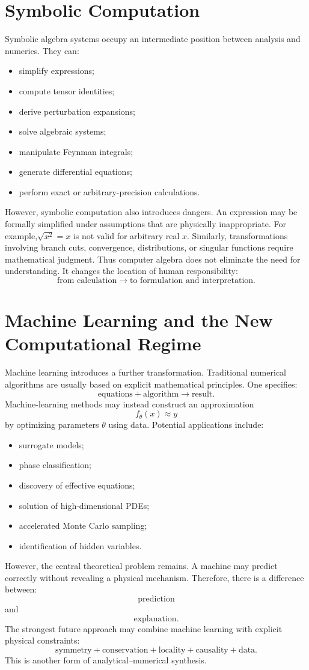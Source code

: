 \section{ Symbolic Computation}
\label{nm:sc}

Symbolic algebra systems occupy an intermediate position between analysis and numerics.
They can:
\begin{itemize}
\item simplify expressions;
\item compute tensor identities;
\item derive perturbation expansions;
\item solve algebraic systems;
\item manipulate Feynman integrals;
\item generate differential equations;
\item perform exact or arbitrary-precision calculations.
\end{itemize}
However, symbolic computation also introduces dangers.
An expression may be formally simplified under assumptions that are physically inappropriate.
For example,$\sqrt{x^2}=x$ is not valid for arbitrary real $x$.
Similarly, transformations involving branch cuts, convergence, distributions,
or singular functions require mathematical judgment.
Thus computer algebra does not eliminate the need for understanding.
It changes the location of human responsibility:
\[\text{from calculation}\rightarrow\text{to formulation and interpretation}.\]

\section{ Machine Learning and the New Computational Regime}
\label{nm:ml}

Machine learning introduces a further transformation.
Traditional numerical algorithms are usually based on explicit mathematical principles. One specifies:
\[\text{equations}+\text{algorithm}\rightarrow\text{result}.\]
Machine-learning methods may instead construct an approximation
\[f_\theta(x)\approx y\]
by optimizing parameters $\theta$ using data.
Potential applications include:
\begin{itemize}
\item surrogate models;
\item phase classification;
\item discovery of effective equations;
\item solution of high-dimensional PDEs;
\item accelerated Monte Carlo sampling;
\item identification of hidden variables.
\end{itemize}
However, the central theoretical problem remains.
A machine may predict correctly without revealing a physical mechanism.
Therefore, there is a difference between:
\[\text{prediction}\]
and
\[\text{explanation}.\]
The strongest future approach may combine machine learning with explicit physical constraints:
\[\text{symmetry}+\text{conservation}+\text{locality}+\text{causality}+\text{data}.\]
This is another form of analytical--numerical synthesis.

